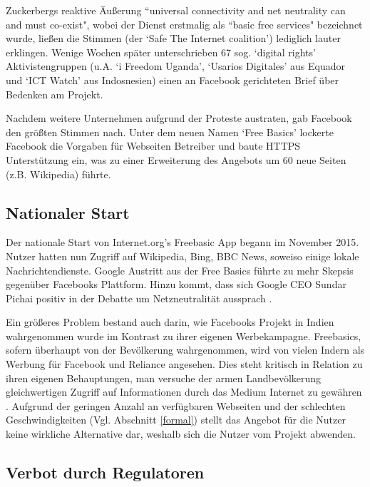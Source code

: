 \documentclass{article}
\begin{document}
Zuckerbergs reaktive Äußerung ``universal connectivity and net neutrality can and must co-exist", wobei der Dienst erstmalig als ``basic free services" bezeichnet wurde, ließen die Stimmen (der `Safe The Internet coalition') lediglich lauter erklingen.
Wenige Wochen später unterschrieben 67 sog. `digital rights' Aktivistengruppen (u.A. `i Freedom Uganda', `Usarios Digitales' aus Equador und `ICT Watch' aus Indosnesien) einen an Facebook gerichteten Brief über Bedenken am Projekt.

\medskip

Nachdem weitere Unternehmen aufgrund der Proteste austraten, gab Facebook den größten Stimmen nach. Unter dem neuen Namen `Free Basics' lockerte Facebook die Vorgaben für Webseiten Betreiber und baute HTTPS Unterstützung ein, was zu einer Erweiterung des Angebots um 60 neue Seiten (z.B. Wikipedia) führte.

\subsection{Nationaler Start} \label{national}

Der nationale Start von Internet.org's Freebasic App begann im November 2015. Nutzer hatten nun Zugriff auf Wikipedia, Bing, BBC News, soweiso einige lokale Nachrichtendienste.
Google Austritt aus der Free Basics führte zu mehr Skepsis gegenüber Facebooks Plattform.
Hinzu kommt, dass sich Google CEO Sundar Pichai positiv in der Debatte um Netzneutralität aussprach \parencite{easeOfBusiness}.

Ein größeres Problem bestand auch darin, wie Facebooks Projekt in Indien wahrgenommen wurde im Kontrast zu ihrer eigenen Werbekampagne.
Freebasics, sofern überhaupt von der Bevölkerung wahrgenommen, wird von vielen Indern als Werbung für Facebook und Reliance angesehen.
Dies steht kritisch in Relation zu ihren eigenen Behauptungen, man versuche der armen Landbevölkerung gleichwertigen Zugriff auf Informationen durch das Medium Internet zu gewähren \parencite[4]{everydayLife}.
Aufgrund der geringen Anzahl an verfügbaren Webseiten und der schlechten Geschwindigkeiten (Vgl. Abschnitt \ref{formal}) stellt das Angebot für die Nutzer keine wirkliche Alternative dar, weshalb sich die Nutzer vom Projekt abwenden\autocite{nyt1}.
	
\subsection{Verbot durch Regulatoren}
\end{document}
